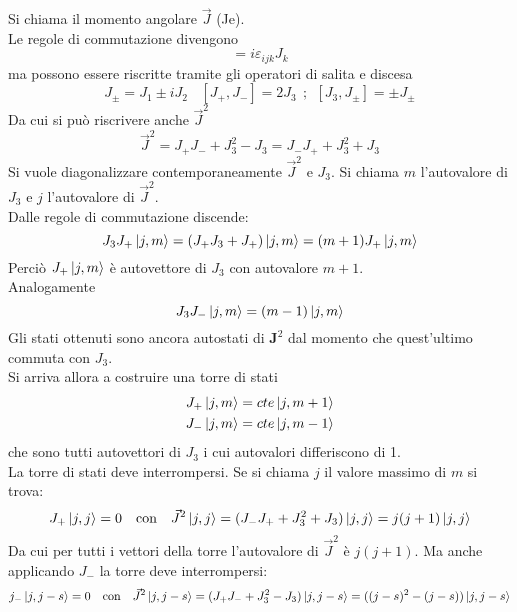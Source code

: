 \documentclass[twoside]{article}
\renewcommand{\vec}[1]{\textbf{#1}}
\begin{document}
Si chiama il momento angolare $\Vec{J}$ (Je).
\\
Le regole di commutazione divengono
\begin{equation}
    [J_i,J_j]=i\varepsilon_{ijk}J_k
\end{equation}
ma possono essere riscritte tramite gli operatori di salita e discesa 
\begin{equation}
    J_{\pm}=J_1\pm i J_2 \ \ \ \ [J_+,J_-]=2J_3 \ \ ; \ \ [J_3,J_{\pm}]=\pm J_{\pm}
\end{equation}
Da cui si può riscrivere anche $\Vec{J}^2$
\begin{equation}
    \Vec{J}^2=J_+J_-+J_3 ^2 - J_3 =J_-J_++J_3^2+J_3
\end{equation}
Si vuole diagonalizzare contemporaneamente $\Vec{J}^2$ e $J_3$. Si chiama $m$ l'autovalore di $J_3$ e $j$ l'autovalore di $\Vec{J}^2$.
\\
Dalle regole di commutazione discende:
\begin{equation}
    J_3J_+\ket{j,m}=(J_+J_3+J_+)\ket{j,m}=(m+1)J_+\ket{j,m}
\end{equation}
Perciò $J_+\ket{j,m}$ è autovettore di $J_3$ con autovalore $m+1$.
\\
Analogamente
\begin{equation}
    J_3J_-\ket{j,m}=(m-1)\ket{j,m}
\end{equation}
Gli stati ottenuti sono ancora autostati di $\vec{J}^2$ dal momento che quest'ultimo commuta con $J_3$.
\\
Si arriva allora a costruire una torre di stati
\begin{equation} \label{9.4.6}
    \begin{split}
        J_+\ket{j,m}=cte\ket{j,m+1} \\
        J_-\ket{j,m}=cte\ket{j,m-1}
    \end{split}
\end{equation}
che sono tutti autovettori di $J_3$ i cui autovalori differiscono di 1.
\\
La torre di stati deve interrompersi. Se si chiama $j$ il valore massimo di $m$ si trova:
\begin{equation}
    J_+\ket{j,j}=0 \ \ \ \text{con} \ \ \ \Vec{J}^2\ket{j,j}=(J_-J_++J_3^2+J_3)\ket{j,j}=j(j+1)\ket{j,j}
\end{equation}
Da cui per tutti i vettori della torre l'autovalore di $\Vec{J}^2$ è $j(j+1)$. Ma anche applicando $J_-$ la torre deve interrompersi:
\begin{equation}
    j_-\ket{j,j-s}=0 \ \ \ \text{con} \ \ \ \Vec{J}^2\ket{j,j-s}=(J_+J_-+J_3^2-J_3)\ket{j,j-s}=((j-s)^2-(j-s))\ket{j,j-s}
\end{equation}
\end{document}
